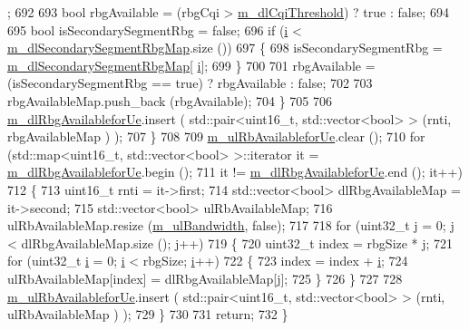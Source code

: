 \begin{DoxyCode}
      ;
692 
693           \textcolor{keywordtype}{bool} rbgAvailable = (rbgCqi > \hyperlink{classns3_1_1LteFfrEnhancedAlgorithm_a689079599521cf458db492f362d3c2bb}{m\_dlCqiThreshold}) ? \textcolor{keyword}{true} : \textcolor{keyword}{false};
694 
695           \textcolor{keywordtype}{bool} isSecondarySegmentRbg = \textcolor{keyword}{false};
696           \textcolor{keywordflow}{if} (\hyperlink{bernuolliDistribution_8m_a6f6ccfcf58b31cb6412107d9d5281426}{i} < \hyperlink{classns3_1_1LteFfrEnhancedAlgorithm_a600e9d11aa25cdbf62e055fbcce44e8b}{m\_dlSecondarySegmentRbgMap}.size ())
697             \{
698               isSecondarySegmentRbg = \hyperlink{classns3_1_1LteFfrEnhancedAlgorithm_a600e9d11aa25cdbf62e055fbcce44e8b}{m\_dlSecondarySegmentRbgMap}[
      \hyperlink{bernuolliDistribution_8m_a6f6ccfcf58b31cb6412107d9d5281426}{i}];
699             \}
700 
701           rbgAvailable = (isSecondarySegmentRbg == \textcolor{keyword}{true}) ? rbgAvailable : \textcolor{keyword}{false};
702 
703           rbgAvailableMap.push\_back (rbgAvailable);
704         \}
705 
706       \hyperlink{classns3_1_1LteFfrEnhancedAlgorithm_a4e860f4983b4082a15d9327ea3328f37}{m\_dlRbgAvailableforUe}.insert ( std::pair<uint16\_t, std::vector<bool> > (rnti, 
      rbgAvailableMap ) );
707     \}
708 
709   \hyperlink{classns3_1_1LteFfrEnhancedAlgorithm_ad079cda461248eb88043b5b461cd8b67}{m\_ulRbAvailableforUe}.clear ();
710   \textcolor{keywordflow}{for} (std::map<uint16\_t, std::vector<bool> >::iterator it = 
      \hyperlink{classns3_1_1LteFfrEnhancedAlgorithm_a4e860f4983b4082a15d9327ea3328f37}{m\_dlRbgAvailableforUe}.begin ();
711        it != \hyperlink{classns3_1_1LteFfrEnhancedAlgorithm_a4e860f4983b4082a15d9327ea3328f37}{m\_dlRbgAvailableforUe}.end (); it++)
712     \{
713       uint16\_t rnti = it->first;
714       std::vector<bool> dlRbgAvailableMap = it->second;
715       std::vector<bool> ulRbAvailableMap;
716       ulRbAvailableMap.resize (\hyperlink{classns3_1_1LteFfrAlgorithm_acfa0105633ee5c27538c3309eb132d21}{m\_ulBandwidth}, \textcolor{keyword}{false});
717 
718       \textcolor{keywordflow}{for} (uint32\_t j = 0; j < dlRbgAvailableMap.size (); j++)
719         \{
720           uint32\_t index = rbgSize * j;
721           \textcolor{keywordflow}{for} (uint32\_t \hyperlink{bernuolliDistribution_8m_a6f6ccfcf58b31cb6412107d9d5281426}{i} = 0; \hyperlink{bernuolliDistribution_8m_a6f6ccfcf58b31cb6412107d9d5281426}{i} < rbgSize; \hyperlink{bernuolliDistribution_8m_a6f6ccfcf58b31cb6412107d9d5281426}{i}++)
722             \{
723               index = index + \hyperlink{bernuolliDistribution_8m_a6f6ccfcf58b31cb6412107d9d5281426}{i};
724               ulRbAvailableMap[index] = dlRbgAvailableMap[j];
725             \}
726         \}
727 
728       \hyperlink{classns3_1_1LteFfrEnhancedAlgorithm_ad079cda461248eb88043b5b461cd8b67}{m\_ulRbAvailableforUe}.insert ( std::pair<uint16\_t, std::vector<bool> > (rnti, 
      ulRbAvailableMap ) );
729     \}
730 
731   \textcolor{keywordflow}{return};
732 \}
\end{DoxyCode}


